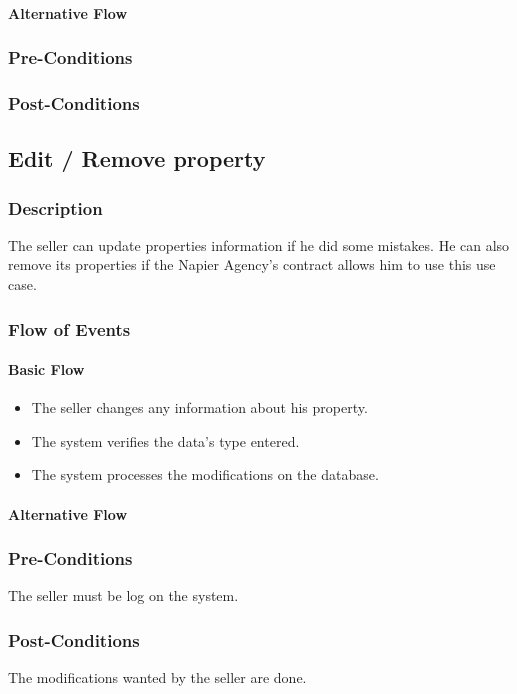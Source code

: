 \documentclass[a4paper,12pt]{article}
\begin{document}
\paragraph{Alternative Flow}
\begin{itemize}
\end{itemize}
\subsubsection{Pre-Conditions}
\subsubsection{Post-Conditions}

\subsection{Edit / Remove property}
\subsubsection{Description}
The seller can update properties information if he did some mistakes. He can also remove its properties if the Napier Agency's contract allows him to use this use case.
\subsubsection{Flow of Events}
\paragraph{Basic Flow}
\begin{itemize}
\item The seller changes any information about his property.
\item The system verifies the data's type entered.
\item The system processes the modifications on the database.
\end{itemize}
\paragraph{Alternative Flow}
\begin{itemize}
\end{itemize}
\subsubsection{Pre-Conditions}
The seller must be log on the system.
\subsubsection{Post-Conditions}
The modifications wanted by the seller are done.
\end{document}
